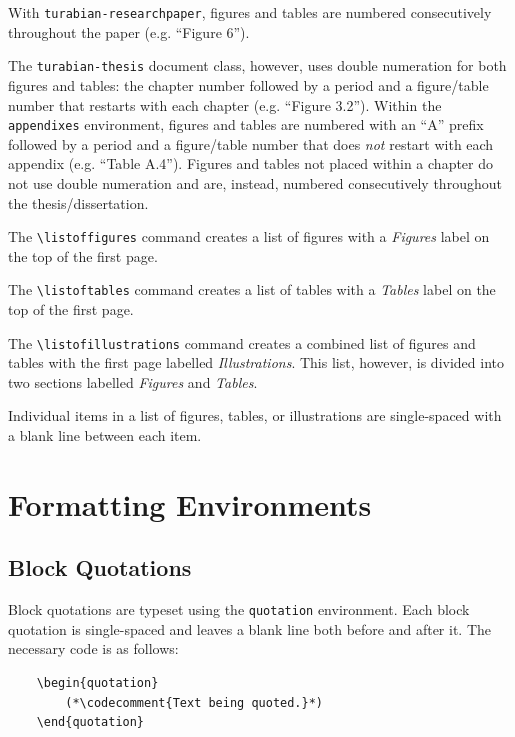 \documentclass{article}
\newcommand{\codecomment}[1]{\textrm{$\langle$\emph{#1}$\rangle$}}
\newcommand{\textcmd}[1]{\texttt{\textbackslash #1}}
\begin{document}
With \texttt{turabian-researchpaper}, figures and tables are numbered consecutively throughout the paper (e.g. ``Figure 6'').

The \texttt{turabian-thesis} document class, however, uses double numeration for both figures and tables: the chapter number followed by a period and a figure/table number that restarts with each chapter (e.g. ``Figure 3.2''). Within the \texttt{appendixes} environment, figures and tables are numbered with an ``A'' prefix followed by a period and a figure/table number that does \emph{not} restart with each appendix (e.g. ``Table A.4''). Figures and tables not placed within a chapter do not use double numeration and are, instead, numbered consecutively throughout the thesis/dissertation.

The \textcmd{listoffigures} command creates a list of figures with a \emph{Figures} label on the top of the first page.

The \textcmd{listoftables} command creates a list of tables with a \emph{Tables} label on the top of the first page.

\marginnote{\textcmd{listofillustrations}}
The \textcmd{listofillustrations} command creates a combined list of figures and tables with the first page labelled \emph{Illustrations}. This list, however, is divided into two sections labelled \emph{Figures} and \emph{Tables}.\autocite[393]{turabian_manual_2018}

Individual items in a list of figures, tables, or illustrations are single-spaced with a blank line between each item.\autocite[393]{turabian_manual_2018}


\clearpage
\section{Formatting Environments}
\label{sec:formatting_environments}


\subsection{Block Quotations}
Block quotations are typeset using the \texttt{quotation} environment. Each block quotation is single-spaced and leaves a blank line both before and after it. The necessary code is as follows:

\begin{lstlisting}
	\begin{quotation}
		(*\codecomment{Text being quoted.}*)
	\end{quotation}
\end{lstlisting}
\end{document}
